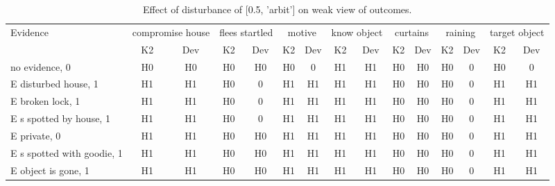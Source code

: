 \begin{table}\begin{tabular}{l|cc|cc|cc|cc|cc|cc|cc}\toprule\multirow{2}{*}{Evidence} & \multicolumn{2}{c}{compromise house}& \multicolumn{2}{c}{flees startled}& \multicolumn{2}{c}{motive}& \multicolumn{2}{c}{know object}& \multicolumn{2}{c}{curtains}& \multicolumn{2}{c}{raining}& \multicolumn{2}{c}{target object}\\& {K2} & {Dev}& {K2} & {Dev}& {K2} & {Dev}& {K2} & {Dev}& {K2} & {Dev}& {K2} & {Dev}& {K2} & {Dev}\\\midrule
no evidence, 0 & H0&H0&H0&H0&\cellcolor{Bittersweet}H0&\cellcolor{Bittersweet}0&H1&H1&H0&H0&\cellcolor{Bittersweet}H0&\cellcolor{Bittersweet}0&\cellcolor{Bittersweet}H0&\cellcolor{Bittersweet}0\\E disturbed house, 1 & H1&H1&\cellcolor{Bittersweet}H0&\cellcolor{Bittersweet}0&H1&H1&H1&H1&H0&H0&\cellcolor{Bittersweet}H0&\cellcolor{Bittersweet}0&H1&H1\\E broken lock, 1 & H1&H1&\cellcolor{Bittersweet}H0&\cellcolor{Bittersweet}0&H1&H1&H1&H1&H0&H0&\cellcolor{Bittersweet}H0&\cellcolor{Bittersweet}0&H1&H1\\E s spotted by house, 1 & H1&H1&\cellcolor{Bittersweet}H0&\cellcolor{Bittersweet}0&H1&H1&H1&H1&H0&H0&\cellcolor{Bittersweet}H0&\cellcolor{Bittersweet}0&H1&H1\\E private, 0 & H1&H1&H0&H0&H1&H1&H1&H1&H0&H0&\cellcolor{Bittersweet}H0&\cellcolor{Bittersweet}0&H1&H1\\E s spotted with goodie, 1 & H1&H1&H0&H0&H1&H1&H1&H1&H0&H0&\cellcolor{Bittersweet}H0&\cellcolor{Bittersweet}0&H1&H1\\E object is gone, 1 & H1&H1&H0&H0&H1&H1&H1&H1&H0&H0&\cellcolor{Bittersweet}H0&\cellcolor{Bittersweet}0&H1&H1\\\bottomrule\end{tabular}\caption{Effect of disturbance of [0.5, 'arbit'] on weak view of outcomes.}\end{table}
